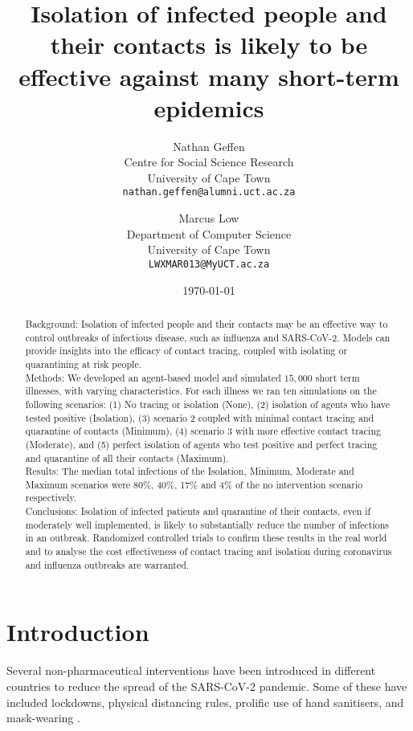 \documentclass{article}
\title{Isolation of infected people and their contacts is likely to be effective
  against many short-term epidemics}
\author{
  Nathan Geffen \\
  Centre for Social Science Research\\
  University of Cape Town\\
  \texttt{nathan.geffen@alumni.uct.ac.za} \\
  \and
  Marcus Low\\
  Department of Computer Science\\
  University of Cape Town\\
  \texttt{LWXMAR013@MyUCT.ac.za}}
\date{\today}
\begin{document}
\maketitle

\begin{abstract}

  Background: Isolation of infected people and their contacts may be an
  effective way to control outbreaks of infectious disease, such as influenza
  and SARS-CoV-2. Models can provide insights into the efficacy of contact
  tracing, coupled with isolating or quarantining at risk people.\\
  Methods: We developed an agent-based model and simulated $15,000$ short term
  illnesses, with varying characteristics. For
  each illness we ran ten simulations on the following scenarios: (1) No
  tracing or isolation (None), (2) isolation of agents who have tested positive
  (Isolation), (3) scenario 2 coupled with minimal contact tracing and quarantine
  of contacts (Minimum), (4) scenario 3 with more effective contact tracing
  (Moderate), and (5) perfect isolation of agents who test positive and perfect
  tracing and quarantine of all their contacts (Maximum).\\
  Results: The median total infections of the Isolation, Minimum, Moderate and
  Maximum scenarios were 80\%, 40\%, 17\% and 4\% of the no intervention
  scenario respectively.\\
  Conclusions: Isolation of infected patients and quarantine of their contacts,
  even if moderately well implemented, is likely to substantially reduce the
  number of infections in an outbreak. Randomized controlled trials to confirm
  these results in the real world and to analyse the cost effectiveness of
  contact tracing and isolation during coronavirus and influenza outbreaks are
  warranted.

\end{abstract}


\section{Introduction}

Several non-pharmaceutical interventions have been introduced in different
countries to reduce the spread of the SARS-CoV-2 pandemic. Some of these have
included lockdowns, physical distancing rules, prolific use of hand sanitisers,
and mask-wearing \cite{Flaxman2020,Lemaitre2020,Cowling2020}.
\end{document}
